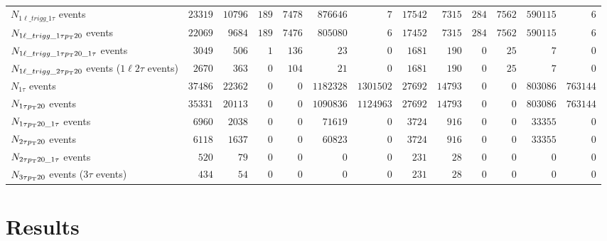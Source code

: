 \documentclass[letterpaper,12pt]{article}
\begin{document}
\begin{table}[h]
{\begin{tabular}{l|rr|rrrr|rr|rrrr}
      $N_{1\ell\_trigg\_1\tau}$ events & $23319$ & $10796$ & $189$ & $7478$ & $876646$ & $7$ & $17542$ & $7315$ & $284$ & $7562$ & $590115$ & $6$\\
      $N_{1\ell\_trigg\_1\tau p_{\mathrm{T}}20}$ events & $22069$ & $9684$ & $189$ & $7476$ & $805080$ & $6$ & $17452$ & $7315$ & $284$ & $7562$ & $590115$ & $6$\\
      $N_{1\ell\_trigg\_1\tau p_{\mathrm{T}}20\_1\tau}$ events & $3049$ & $506$ & $1$ & $136$ & $23$ & $0$ & $1681$ & $190$ & $0$ & $25$ & $7$ & $0$\\
      $N_{1\ell\_trigg\_2\tau p_{\mathrm{T}}20}$ events ($1\ell2\tau$ events) & $2670$ & $363$ & $0$ & $104$ & $21$ & $0$ & $1681$ & $190$ & $0$ & $25$ & $7$ & $0$\\
      $N_{1\tau}$ events & $37486$ & $22362$ & $0$ & $0$ & $1182328$ & $1301502$ & $27692$ & $14793$ & $0$ & $0$ & $803086$ & $763144$\\
      $N_{1\tau p_{\mathrm{T}}20}$ events & $35331$ & $20113$ & $0$ & $0$ & $1090836$ & $1124963$ & $27692$ & $14793$ & $0$ & $0$ & $803086$ & $763144$\\
      $N_{1\tau p_{\mathrm{T}}20\_1\tau}$ events & $6960$ & $2038$ & $0$ & $0$ & $71619$ & $0$ & $3724$ & $916$ & $0$ & $0$ & $33355$ & $0$\\
      $N_{2\tau p_{\mathrm{T}}20}$ events & $6118$ & $1637$ & $0$ & $0$ & $60823$ & $0$ & $3724$ & $916$ & $0$ & $0$ & $33355$ & $0$\\
      $N_{2\tau p_{\mathrm{T}}20\_1\tau}$ events & $520$ & $79$ & $0$ & $0$ & $0$ & $0$ & $231$ & $28$ & $0$ & $0$ & $0$ & $0$\\
      $N_{3\tau p_{\mathrm{T}}20}$ events ($3\tau$ events) & $434$ & $54$ & $0$ & $0$ & $0$ & $0$ & $231$ & $28$ & $0$ & $0$ & $0$ & $0$\\
      \hline
      \hline	
    \end{tabular}%
  }
  \caption{}
  \label{tab:cutflow}
\end{table}

\section{Results}
\label{sec:results}
\end{document}
